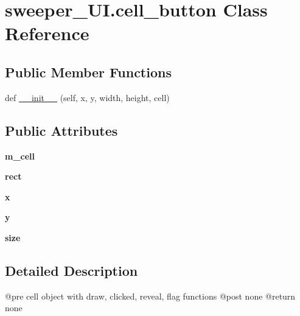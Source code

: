 \hypertarget{classsweeper___u_i_1_1cell__button}{}\section{sweeper\+\_\+\+U\+I.\+cell\+\_\+button Class Reference}
\label{classsweeper___u_i_1_1cell__button}
\subsection*{Public Member Functions}
\begin{DoxyCompactItemize}
\item 
def \mbox{\hyperlink{classsweeper___u_i_1_1cell__button_a331ff79c7f93f68d677c7b6aaafbc23a}{\+\_\+\+\_\+init\+\_\+\+\_\+}} (self, x, y, width, height, cell)
\end{DoxyCompactItemize}
\subsection*{Public Attributes}
\begin{DoxyCompactItemize}
\item 
\mbox{\label{classsweeper___u_i_1_1cell__button_aeec9de7b86691855cbf3f7ca4e35e2bb}} 
{\bfseries m\+\_\+cell}
\item 
\mbox{\label{classsweeper___u_i_1_1cell__button_a70b060c327eb8b214d9cd70c40260d98}} 
{\bfseries rect}
\item 
\mbox{\label{classsweeper___u_i_1_1cell__button_a6acbd87cea0972e28cf86366579af805}} 
{\bfseries x}
\item 
\mbox{\label{classsweeper___u_i_1_1cell__button_aa14681a2e65b5acf370043ced5e4115a}} 
{\bfseries y}
\item 
\mbox{\label{classsweeper___u_i_1_1cell__button_a9b3dd9fed2a556108c300305a271da8b}} 
{\bfseries size}
\end{DoxyCompactItemize}


\subsection{Detailed Description}
\begin{DoxyVerb}@pre cell object with draw, clicked, reveal, flag functions
@post none
@return none
\end{DoxyVerb}
 

